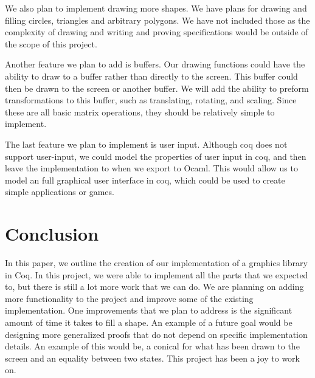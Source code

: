 \documentclass{llncs}
\begin{document}
We also plan to implement drawing more shapes. We have plans for drawing and filling circles, triangles and arbitrary polygons. We have not included those as the complexity of drawing and writing and proving specifications would be outside of the scope of this project.

Another feature we plan to add is buffers. Our drawing functions could have the ability to draw to a buffer rather than directly to the screen. This buffer could then be drawn to the screen or another buffer. We will add the ability to preform transformations to this buffer, such as translating, rotating, and scaling. Since these are all basic matrix operations, they should be relatively simple to implement.

The last feature we plan to implement is user input. Although coq does not support user-input, we could model the properties of user input in coq, and then leave the implementation to when we export to Ocaml. This would allow us to model an full graphical user interface in coq, which could be used to create simple applications or games.

\section{Conclusion}
In this paper, we outline the creation of our implementation of a graphics
library in Coq. In this project, we were able to implement all the parts that we
expected to, but there is still a lot more work that we can do. We are planning
on adding more functionality to the project and improve some of the existing
implementation. One improvements that we plan to address is the significant
amount of time it takes to fill a shape. An example of a future goal would be
designing more generalized proofs that do not depend on specific implementation
details. An example of this would be, a conical for what has been drawn to the
screen and an equality between two states. This project has been a joy to work
on.





\end{document}
